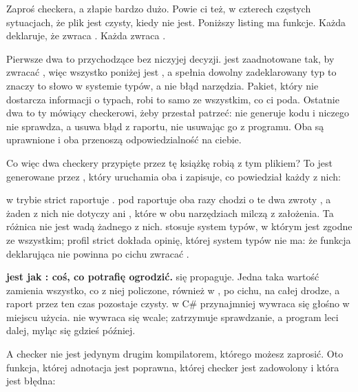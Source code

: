 Zaproś checkera, a złapie bardzo dużo. Powie ci też, w czterech częstych
sytuacjach, że plik jest czysty, kiedy nie jest. Poniższy listing ma
 funkcje. Każda deklaruje, że zwraca .
Każda zwraca .


\noindent
Pierwsze dwa to  przychodzące bez niczyjej decyzji.
 jest zaadnotowane tak, by zwracać , więc wszystko
poniżej jest , a  spełnia dowolny zadeklarowany typ
\dash{} to znaczy to słowo w systemie typów, a nie błąd narzędzia. Pakiet,
który nie dostarcza informacji o typach, robi to samo ze wszystkim, co ci
poda. Ostatnie dwa to ty mówiący checkerowi, żeby przestał patrzeć:
 nie generuje kodu i niczego nie sprawdza, a 
usuwa błąd z raportu, nie usuwając go z programu. Oba są uprawnione i oba
przenoszą odpowiedzialność na ciebie.

Co więc dwa checkery przypięte przez tę książkę robią z tym plikiem? To jest
generowane przez , który uruchamia oba i
zapisuje, co powiedział każdy z nich:


\noindent
{} w trybie strict raportuje .
 pod  raportuje  \dash{}
oba razy chodzi o te dwa zwroty , a żaden z nich nie dotyczy
 ani , które w obu narzędziach milczą z
założenia. Ta różnica nie jest wadą żadnego z nich.  stosuje
system typów, w którym  jest zgodne ze wszystkim; profil strict
 dokłada opinię, której system typów nie ma: że funkcja
deklarująca  nie powinna po cichu zwracać .

\begin{trapbox}
\textbf{ jest jak : coś, co potrafię ogrodzić.}
 się propaguje. Jedna taka wartość zamienia wszystko, co z niej
policzone, również w , po cichu, na całej drodze, a raport przez ten
czas pozostaje czysty.  w C\# przynajmniej wywraca się głośno w
miejscu użycia.  nie wywraca się wcale; zatrzymuje sprawdzanie, a
program leci dalej, myląc się gdzieś później.
\end{trapbox}

A checker nie jest jedynym drugim kompilatorem, którego możesz zaprosić. Oto
funkcja, której adnotacja jest poprawna, której checker jest zadowolony i
która jest błędna:

